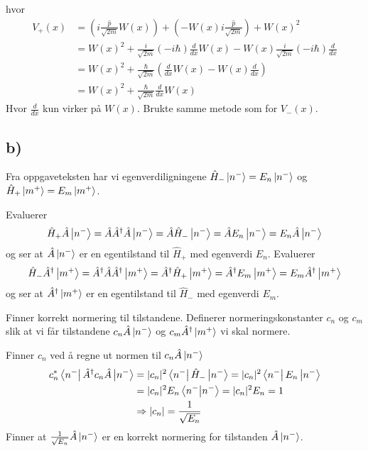 \documentclass[norsk,a4paper,12pt]{article}
\begin{document}
hvor
\begin{equation}
\begin{aligned}
	V_+(x) &= (i\frac{\hat p}{\sqrt{2m}} W(x)) + (-W(x) i\frac{\hat p}{\sqrt{2m}}) + W(x)^2 \\
	&= W(x)^2 + \frac{i}{\sqrt{2m}}(-i\hbar) \frac{d}{d x} W(x) - W(x) \frac{i}{\sqrt{2m}}(-i\hbar) \frac{d}{d x} \\
	&= W(x)^2 + \frac{\hbar}{\sqrt{2m}} (\frac{d}{d x}W(x) - W(x)\frac{d}{d x}) \\
	&= W(x)^2 + \frac{\hbar}{\sqrt{2m}} \frac{d}{d x}W(x)
\end{aligned}
\end{equation}
Hvor $\frac{d}{d x}$ kun virker på $W(x)$. Brukte samme metode som for $V_-(x)$.

\subsection*{b)}
Fra oppgaveteksten har vi egenverdiligningene $\hat{H}_- \ket{n^-} = E_n \ket{n^-}$ og $\hat{H}_+ \ket{m^+} = E_m \ket{m^+}$.

Evaluerer
\begin{equation}
\begin{aligned}
	\hat{H}_+ \hat{A} \ket{n^-} = \hat{A} \hat{A}^\dagger \hat{A} \ket{n^-} = \hat{A} \hat{H}_- \ket{n^-} = \hat{A} E_n \ket{n^-} = E_n \hat{A} \ket{n^-}
\end{aligned}
\end{equation}
og ser at $\hat{A} \ket{n^-}$ er en egentilstand til $\hat{H}_+$ med egenverdi $E_n$. Evaluerer
\begin{equation}
\begin{aligned}
	\hat{H}_- \hat{A}^\dagger \ket{m^+} = \hat{A}^\dagger \hat{A} \hat{A}^\dagger \ket{m^+} = \hat{A}^\dagger \hat{H}_+ \ket{m^+} = \hat{A}^\dagger E_m \ket{m^+} = E_m \hat{A}^\dagger \ket{m^+}
\end{aligned}
\end{equation}
og ser at $\hat{A}^\dagger \ket{m^+}$ er en egentilstand til $\hat{H}_-$ med egenverdi $E_m$.

Finner korrekt normering til tilstandene. Definerer normeringskonstanter $c_n$ og $c_m$ slik at vi får tilstandene $c_n \hat{A} \ket{n^-}$ og $c_m \hat{A}^\dagger \ket{m^+}$ vi skal normere.

Finner $c_n$ ved å regne ut normen til $c_n \hat{A} \ket{n^-}$
\begin{equation}
\begin{aligned}
	 c_n^* \bra{n^-} \hat{A}^\dagger c_n \hat{A} \ket{n^-} &= |c_n|^2 \bra{n^-} \hat{H}_- \ket{n^-} = |c_n|^2 \bra{n^-} E_n \ket{n^-} \\
	 &= |c_n|^2 E_n \bra{n^-}\ket{n^-} = |c_n|^2 E_n = 1 \\
	 &\Rightarrow |c_n| = \frac{1}{\sqrt{E_n}}
\end{aligned}
\end{equation}
Finner at $\frac{1}{\sqrt{E_n}} \hat{A} \ket{n^-}$ er en korrekt normering for tilstanden $\hat{A} \ket{n^-}$.
\end{document}
